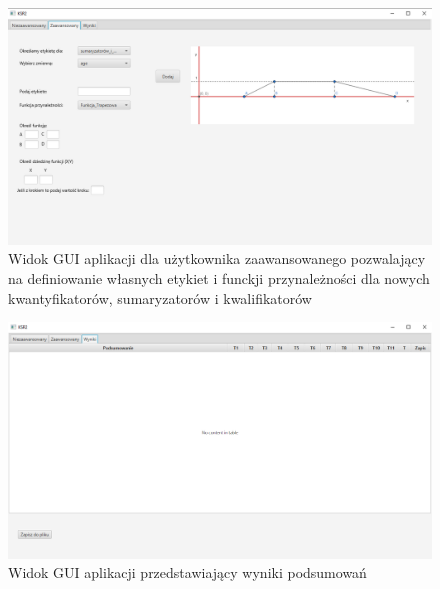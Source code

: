 \documentclass{classrep}
\begin{document}
  \begin{figure}[H]
    \centering
    \includegraphics[scale = 0.5]{gui2}
    \caption{Widok GUI aplikacji dla użytkownika zaawansowanego pozwalający na definiowanie własnych etykiet i funckji przynależności dla nowych kwantyfikatorów, sumaryzatorów i kwalifikatorów}
  \end{figure}
  
  \begin{figure}[H]
    \centering
    \includegraphics[scale = 0.5]{gui3}
    \caption{Widok GUI aplikacji przedstawiający wyniki podsumowań}
  \end{figure}




\end{document}
